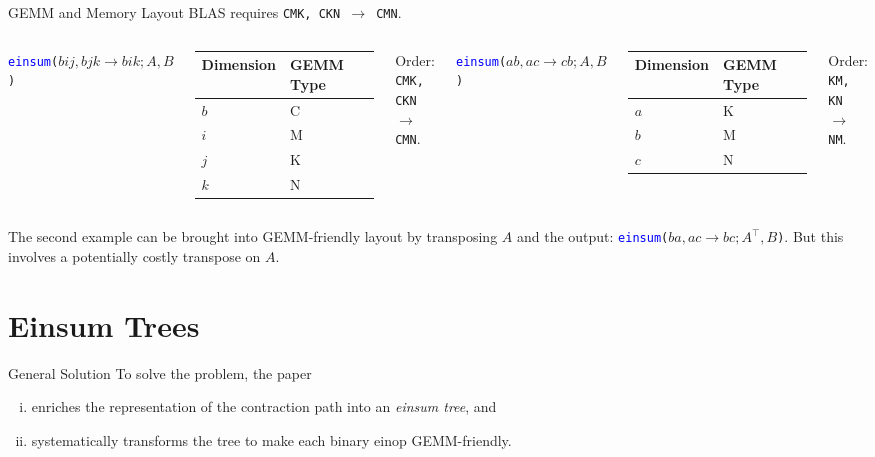 \documentclass[aspectratio=169,10pt]{beamer}
\newcommand{\ein}[1]{\texttt{\textcolor{blue}{einsum}(#1)}}
\newcommand{\code}[1]{{\texttt{\colorbox{CodeBg}{#1}}}}
\begin{document}
\begin{frame}{GEMM and Memory Layout}
BLAS requires \code{CMK, CKN $\to$ CMN}.
\bigskip
	\begin{columns}
	\ein{$bij,bjk \to bik; A, B$}
	
	\begin{tabular}{ll}
	 	\toprule
		\textbf{Dimension} & \textbf{GEMM Type}\\
		\midrule
		$b$ & C \\
		$i$ & M \\
		$j$ & K \\
		$k$ & N \\
		\bottomrule
	\end{tabular}
	
	\medskip
	Order: \code{CMK, CKN $\to$ CMN}.
	
	\ein{$ab,ac \to cb; A, B$}
	
	\begin{tabular}{ll}
	 	\toprule
		\textbf{Dimension} & \textbf{GEMM Type}\\
		\midrule
		$a$ & K \\
		$b$ & M \\
		$c$ & N \\
		\bottomrule
	\end{tabular}	
	
	\medskip
	Order: \code{KM, KN $\to$ NM}.
	\end{columns}

\pause	
\medskip
The second example can be brought into GEMM-friendly layout by transposing $A$ and the output: \ein{$ba, ac \to bc; A^\top, B$}.
But this involves a potentially costly transpose on $A$.
	
\end{frame}

\begin{frame}
	
\end{frame}

\section{Einsum Trees}

\begin{frame}{General Solution}
	To solve the problem, the paper
	\begin{enumerate}[i)]
		\item enriches the representation of the contraction path into an \emph{einsum tree}, and
		\item systematically transforms the tree to make each binary einop GEMM-friendly.
	\end{enumerate}
\end{frame}
\end{document}
